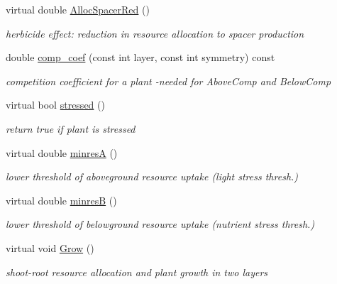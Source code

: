\begin{DoxyCompactItemize}
\mbox{\label{class_c_plant_a8b9c9c25a8aabf4275e206810b9c62e3}} 
virtual double \mbox{\hyperlink{class_c_plant_a8b9c9c25a8aabf4275e206810b9c62e3}{Alloc\+Spacer\+Red}} ()
\begin{DoxyCompactList}\small\item\em herbicide effect\+: reduction in resource allocation to spacer production \end{DoxyCompactList}\item 
double \mbox{\hyperlink{class_c_plant_aa9b9a4a1be9df4e507144ba3bfde8f50}{comp\+\_\+coef}} (const int layer, const int symmetry) const
\begin{DoxyCompactList}\small\item\em competition coefficient for a plant -\/needed for Above\+Comp and Below\+Comp \end{DoxyCompactList}\item 
virtual bool \mbox{\hyperlink{class_c_plant_a49fa0d1fb6b432339c5156fe31cabf58}{stressed}} ()
\begin{DoxyCompactList}\small\item\em return true if plant is stressed \end{DoxyCompactList}\item 
\mbox{\label{class_c_plant_ad250486a6947c14ef3766126f452a65c}} 
virtual double \mbox{\hyperlink{class_c_plant_ad250486a6947c14ef3766126f452a65c}{minresA}} ()
\begin{DoxyCompactList}\small\item\em lower threshold of aboveground resource uptake (light stress thresh.) \end{DoxyCompactList}\item 
\mbox{\label{class_c_plant_a7af7dce0a3ad9b168850f88dd85d6952}} 
virtual double \mbox{\hyperlink{class_c_plant_a7af7dce0a3ad9b168850f88dd85d6952}{minresB}} ()
\begin{DoxyCompactList}\small\item\em lower threshold of belowground resource uptake (nutrient stress thresh.) \end{DoxyCompactList}\item 
virtual void \mbox{\hyperlink{class_c_plant_a475e1b0149b52abca2a699f20960c552}{Grow}} ()
\begin{DoxyCompactList}\small\item\em shoot-\/root resource allocation and plant growth in two layers \end{DoxyCompactList}\item 

\end{DoxyCompactItemize}
